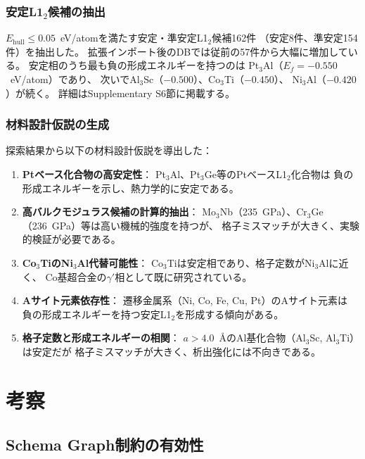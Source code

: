 \documentclass[5p,twocolumn]{elsarticle}
\begin{document}
\subsubsection{安定L1$_2$候補の抽出}

$E_\text{hull} \leq 0.05$~eV/atomを満たす安定・準安定L1$_2$候補162件
（安定8件、準安定154件）を抽出した。
拡張インポート後のDBでは従前の57件から大幅に増加している。
安定相のうち最も負の形成エネルギーを持つのは
Pt$_3$Al（$E_f = -0.550$~eV/atom）であり、
次いでAl$_3$Sc（$-0.500$）、Co$_3$Ti（$-0.450$）、
Ni$_3$Al（$-0.420$）が続く。
詳細はSupplementary S6節に掲載する。

\subsubsection{材料設計仮説の生成}

探索結果から以下の材料設計仮説を導出した：

\begin{enumerate}
  \item \textbf{Ptベース化合物の高安定性}：
    Pt$_3$Al、Pt$_3$Ge等のPtベースL1$_2$化合物は
    負の形成エネルギーを示し、熱力学的に安定である。
  \item \textbf{高バルクモジュラス候補の計算的抽出}：
    Mo$_3$Nb（235~GPa）、Cr$_3$Ge（236~GPa）等は高い機械的強度を持つが、
    格子ミスマッチが大きく、実験的検証が必要である。
  \item \textbf{Co$_3$TiのNi$_3$Al代替可能性}：
    Co$_3$Tiは安定相であり、格子定数がNi$_3$Alに近く、
    Co基超合金の$\gamma'$相として既に研究されている。
  \item \textbf{Aサイト元素依存性}：
    遷移金属系（Ni, Co, Fe, Cu, Pt）のAサイト元素は
    負の形成エネルギーを持つ安定L1$_2$を形成する傾向がある。
  \item \textbf{格子定数と形成エネルギーの相関}：
    $a > 4.0$~\AA のAl基化合物（Al$_3$Sc, Al$_3$Ti）は安定だが
    格子ミスマッチが大きく、析出強化には不向きである。
\end{enumerate}

\section{考察}
\label{sec:discussion}

\subsection{Schema Graph制約の有効性}
\end{document}
